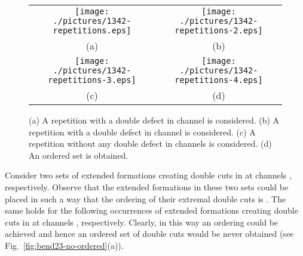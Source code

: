 \documentclass[a4paper,10pt]{llncs}
\renewenvironment{proof}
{{\bf Proof:}}{\hspace*{\fill}\par\vspace{2mm}}
\begin{document}
\begin{proof}
\begin{figure}[htb]
\begin{center}
\begin{tabular}{cc}
\mbox{\texttt{[image: ./pictures/1342-repetitions.eps]}} \hspace{0.1cm} &
\mbox{\texttt{[image: ./pictures/1342-repetitions-2.eps]}} \\
(a) & (b)\\
\mbox{\texttt{[image: ./pictures/1342-repetitions-3.eps]}} \hspace{0.1cm} &
\mbox{\texttt{[image: ./pictures/1342-repetitions-4.eps]}} \\
(c) & (d)\\
\end{tabular}
\caption{(a) A repetition with a double defect in channel  is considered. (b) A repetition with a double defect in channel  is considered. (c) A repetition without any double defect in channels  is considered. (d) An ordered set  is obtained.}\label{fig:1342-repetitions}
\end{center}
\end{figure}

Consider two sets of extended formations creating double cuts in  at channels , respectively. Observe that the extended formations in these two sets could be placed in such a way that the ordering of their extremal double cuts is . The same holds for the following occurrences of extended formations creating double cuts in  at channels , respectively. Clearly, in this way an ordering  could be achieved and hence an ordered set  of double cuts would be never obtained (see Fig.~\ref{fig:bend23-no-ordered}(a)).


\end{proof}
\end{document}
